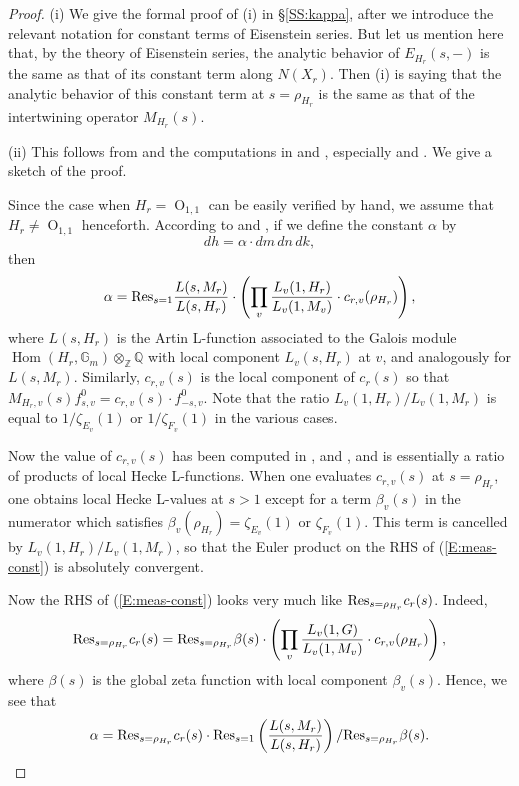 \documentclass[10pt]{amsart}
\theoremstyle{plain}
\numberwithin{equation}{section}
\begin{document}
\begin{proof}
(i)  We give the formal proof of (i) in \S \ref{SS:kappa}, after we
introduce the relevant notation for constant terms of Eisenstein
series. But let us mention here that, by the theory of Eisenstein
series, the analytic behavior of $E_{H_r}(s, -)$
is the same as that of its constant term along $N(X_r)$. Then (i) is saying
that the analytic behavior of this constant term  at $s=\rho_{H_r}$ is the same as that 
of  the intertwining operator $M_{H_r}(s)$. 
 
\vskip 5pt

(ii)  This follows from  \cite[Lemma 9.1]{I2} and the computations in
\cite[\S 9]{Ik} and \cite[\S 9]{I2}, especially \cite[Thm. 9.6 and
9.7]{Ik} and \cite[Thm. 9.5 and 9.6]{I2}. We give a sketch of the proof. 
\vskip 5pt

Since the case when $H_r = {\operatorname{O}}_{1,1}$ can be easily verified by hand, we assume that $H_r \ne {\operatorname{O}}_{1,1}$ henceforth.
According to \cite[Lemma 9.1]{Ik} and \cite[Lemma 9.1]{I2}, if we define the constant $\alpha$ by
\[  dh  = \alpha \cdot dm \, dn \, dk, \]
then 
\begin{equation} \label{E:meas-const}
 \alpha =  {\rm Res}_{s=1}  \frac{L(s, M_r)}{L(s, H_r)}  \cdot \left( \prod_v  \frac{L_v(1,H_r)}{L_v(1, M_v)} \cdot  c_{r,v}(\rho_{H_r}) \right), \end{equation}
where $L(s, H_r)$  is the Artin L-function associated to the Galois module ${\operatorname{Hom}}(H_r, \mathbb{G}_m) \otimes_{\mathbb{Z}} {\mathbb{Q}}$ with local component $L_v(s, H_r)$ at $v$, and analogously for $L(s,M_r)$.  Similarly, $c_{r,v}(s)$ is the local component of $c_r(s)$ so that $M_{H_r,v}(s) f_{s,v}^0 =  c_{r,v}(s) \cdot f_{-s,v}^0$. Note that the ratio
$L_v(1,H_r) / L_v(1, M_r)$ is equal to $1/ \zeta_{E_v}(1)$ or $1/\zeta_{F_v}(1)$ in the various cases. 
\vskip 5pt

Now the value of $c_{r,v}(s)$ has been computed in \cite[\S 9]{Ik}, \cite{I1} and \cite[\S 9]{I2}, and is essentially a ratio of products of local Hecke L-functions. When one evaluates $c_{r,v}(s)$ at $s = \rho_{H_r}$, one obtains local Hecke L-values at $s >1$ except for a term $\beta_v(s)$ in the numerator which satisfies  $\beta_v(\rho_{H_r}) = \zeta_{E_v}(1)$ or $\zeta_{F_v}(1)$.  This term is cancelled by $L_v(1,H_r) / L_v(1, M_r)$, so that the Euler product on the RHS of (\ref{E:meas-const}) is absolutely convergent.
 \vskip 5pt

Now the RHS of (\ref{E:meas-const}) looks very much like ${\rm Res}_{s= \rho_{H_r}} c_r(s)$. Indeed, 
\[  {\rm Res}_{s= \rho_{H_r}} c_r(s)   = {\rm Res}_{s= \rho_{H_r}} \beta(s) 
 \cdot \left( \prod_v  \frac{L_v(1,G)}{L_v(1, M_v)} \cdot  c_{r,v}(\rho_{H_r}) \right), \]
 where $\beta(s)$ is the global zeta function with local component $\beta_v(s)$. Hence, we see that
 \[  \alpha  = {\rm Res}_{s = \rho_{H_r}} c_r(s) \cdot  {\rm Res}_{s=1} \left( \frac{L(s, M_r)}{L(s, H_r)} \right) /
{\rm Res}_{s = \rho_{H_r}} \beta(s). \]
 \vskip 5pt
 

\end{proof}
\end{document}
